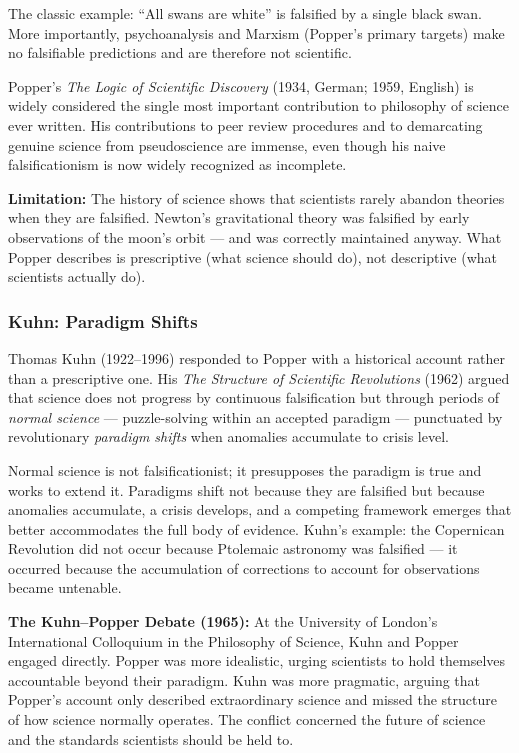 \documentclass[11pt,letterpaper]{article}
\begin{document}
The classic example: ``All swans are white'' is falsified by a single black swan. More importantly, psychoanalysis and Marxism (Popper's primary targets) make no falsifiable predictions and are therefore not scientific.

Popper's \emph{The Logic of Scientific Discovery} (1934, German; 1959, English) is widely considered the single most important contribution to philosophy of science ever written. His contributions to peer review procedures and to demarcating genuine science from pseudoscience are immense, even though his naive falsificationism is now widely recognized as incomplete.

\textbf{Limitation:} The history of science shows that scientists rarely abandon theories when they are falsified. Newton's gravitational theory was falsified by early observations of the moon's orbit --- and was correctly maintained anyway. What Popper describes is prescriptive (what science should do), not descriptive (what scientists actually do).

\subsubsection{Kuhn: Paradigm Shifts}

Thomas Kuhn (1922--1996) responded to Popper with a historical account rather than a prescriptive one. His \emph{The Structure of Scientific Revolutions} (1962) argued that science does not progress by continuous falsification but through periods of \emph{normal science} --- puzzle-solving within an accepted paradigm --- punctuated by revolutionary \emph{paradigm shifts} when anomalies accumulate to crisis level.

Normal science is not falsificationist; it presupposes the paradigm is true and works to extend it. Paradigms shift not because they are falsified but because anomalies accumulate, a crisis develops, and a competing framework emerges that better accommodates the full body of evidence. Kuhn's example: the Copernican Revolution did not occur because Ptolemaic astronomy was falsified --- it occurred because the accumulation of corrections to account for observations became untenable.

\textbf{The Kuhn--Popper Debate (1965):} At the University of London's International Colloquium in the Philosophy of Science, Kuhn and Popper engaged directly. Popper was more idealistic, urging scientists to hold themselves accountable beyond their paradigm. Kuhn was more pragmatic, arguing that Popper's account only described extraordinary science and missed the structure of how science normally operates. The conflict concerned the future of science and the standards scientists should be held to.
\end{document}
